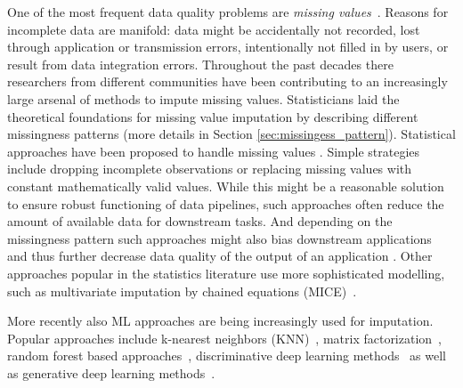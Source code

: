 One of the most frequent data quality problems are \emph{missing values}~\citep{Kumar}. Reasons for incomplete data are manifold: data might be accidentally not recorded, lost through application or transmission errors, intentionally not filled in by users, or result from data integration errors.
%
Throughout the past decades there researchers from different communities have been contributing to an increasingly large arsenal of methods to impute missing values. Statisticians laid the theoretical foundations for missing value imputation \citep{Rubin} by describing different missingness patterns (more details in Section \ref{sec:missingess_pattern}). Statistical approaches have been proposed to handle missing values \citep{Graham}. Simple strategies include dropping incomplete observations or replacing missing values with constant mathematically valid values. While this might be a reasonable solution to ensure robust functioning of data pipelines, such approaches often reduce the amount of available data for downstream tasks. And depending on the missingness pattern such approaches might also bias downstream applications~\citep{Stoyanovich2020,Yang2020} and thus further decrease data quality of the output of an application \citep{Little, Graham}. Other approaches popular in the statistics literature use more sophisticated modelling, such as multivariate imputation by chained equations (MICE)~\citep{Little,vanBuuren2018}.

More recently also ML approaches are being increasingly used for imputation. Popular approaches include k-nearest neighbors (KNN)~\citep{Batista2003}, matrix factorization~\citep{Troyanskaya2001,Koren2009,Mazumder2010}, random forest based approaches~\citep{Stekhoven2012}, discriminative deep learning methods~\citep{Biessmann2018a} as well as generative deep learning methods~\citep{HIVAE,GAIN}.

%

